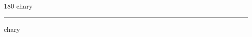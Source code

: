 
\begin{frame}
\begin{center}
\begin{turn}{180}
{\fontsize{2.5cm}{1em}\selectfont chary}
\end{turn}
\vspace{1em}\par  
\hrule
\vspace{1em}\par  
{\fontsize{2.5cm}{1em}\selectfont chary}
\end{center}
\end{frame}
